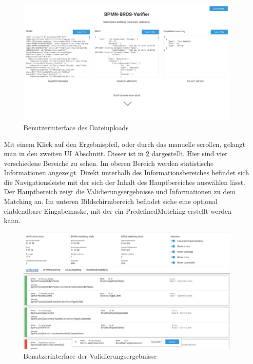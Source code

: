 \begin{figure}
    \centering
    \includegraphics[width=\textwidth,keepaspectratio]{../images/Screenshot-Upload.png}%
    \caption{Benutzerinterface des Dateiuploads}%
    \label{fig:screenshot-upload}
\end{figure}

Mit einem Klick auf den Ergebnispfeil, oder durch das manuelle scrollen, gelangt man in den zweiten UI Abschnitt.
Dieser ist in \cref{fig:screenshot-result} dargestellt.
Hier sind vier verschiedene Bereiche zu sehen.
Im oberen Bereich werden statistische Informationen angezeigt.
Direkt unterhalb des Informationsbereiches befindet sich die Navigationsleiste mit der sich der Inhalt des Hauptbereiches auswählen lässt.
Der Hauptbereich zeigt die Validierungsergebnisse und Informationen zu dem Matching an.
Im unteren Bildschirmbereich befindet siche eine optional einblendbare Eingabemaske, mit der ein PredefinedMatching erstellt werden kann.

\begin{figure}
    \centering
    \includegraphics[width=\textwidth,keepaspectratio]{../images/Screenshot-Result.png}%
    \caption{Benutzerinterface der Validierungsergebnisse}%
    \label{fig:screenshot-result}
\end{figure}

